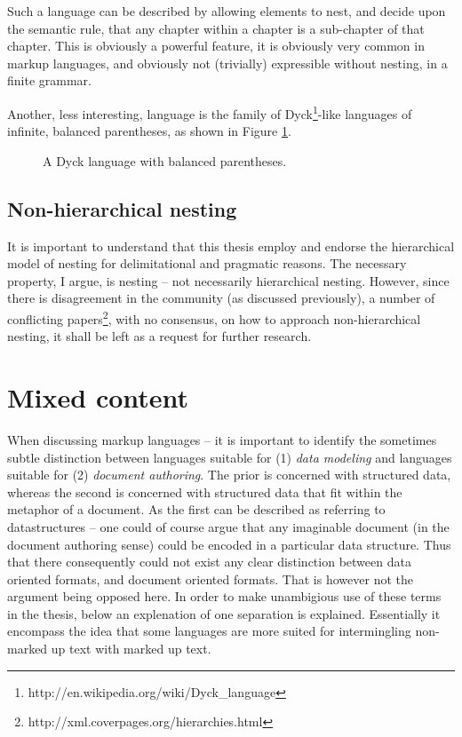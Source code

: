 \documentclass{scrreprt}
\begin{document}
Such a language can be described by allowing elements to nest, and decide upon the semantic rule, that any chapter within a chapter is a sub-chapter of that chapter. This is obviously a powerful feature, it is obviously very common in markup languages, and obviously not (trivially) expressible without nesting, in a finite grammar.

Another, less interesting, language is the family of Dyck\footnote{http://en.wikipedia.org/wiki/Dyck\_language}-like languages of infinite, balanced parentheses, as shown in Figure \ref{fig:mixed-content-nesting}.


\begin{figure}[h]
\centering
{}
\caption{A Dyck language with balanced parentheses.}
\label{fig:mixed-content-nesting}
\end{figure}







\subsection{Non-hierarchical nesting}
\label{sec:non-hierarchical-nesting}
It is important to understand that this thesis employ and endorse the hierarchical model of nesting for delimitational and pragmatic reasons. The necessary property, I argue, is nesting -- not necessarily hierarchical nesting. However, since there is disagreement in the community (as discussed previously), a number of conflicting papers\footnote{http://xml.coverpages.org/hierarchies.html}, with no consensus, on how to approach non-hierarchical nesting, it shall be left as a request for further research.











\section{Mixed content}
\label{sec:mixed-content}
When discussing markup languages -- it is important to identify the sometimes subtle distinction between languages suitable for (1) \emph{data modeling} and languages suitable for (2) \emph{document authoring}. The prior is concerned with structured data, whereas the second is concerned with structured data that fit within the metaphor  of a document. As the first can be described as referring to datastructures -- one could of course argue that any imaginable document (in the document authoring sense) could be encoded in a particular data structure. Thus that there consequently could not exist any clear distinction between data oriented formats, and document oriented formats. That is however not the argument being opposed here. In order to make unambigious use of these terms in the thesis, below an explenation of one separation is explained. Essentially it encompass the idea that some languages are more suited for intermingling non-marked up text with marked up text.
\end{document}
